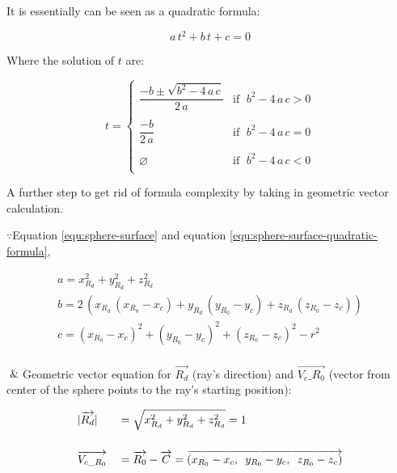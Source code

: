It is essentially can be seen as a quadratic formula:

\begin{equation}
\label{equ:sphere-surface-quadratic-formula}
a\,t^2 + b\,t + c = 0
\end{equation}

Where the solution of $t$ are:

\begin{equation}
\label{equ:sphere-t-solution}
t =
\begin{cases}
\dfrac{-b \pm \sqrt{b^2 - 4\,a\,c}}{2\,a} & \text{if }\;b^2 - 4\,a\,c > 0\\\\
\dfrac{-b}{2\,a} & \text{if }\; b^2 - 4\,a\,c = 0\\\\
\varnothing & \text{if }\; b^2 - 4\,a\,c < 0\\
\end{cases}
\end{equation}

A further step to get rid of formula complexity by taking in geometric vector calculation.


$\because$\;\;\;\;Equation \ref{equ:sphere-surface} and equation \ref{equ:sphere-surface-quadratic-formula},

\[
\begin{array}{lr}
a = x_{R_d}^2 + y_{R_d}^2 + z_{R_d}^2\\
b = 2\,(x_{R_d}\,(x_{R_0} - x_c) + y_{R_d}\,(y_{R_0} - y_c) + z_{R_d}\,(z_{R_0} - z_c))\\
c = (x_{R_0} - x_c)^2 + (y_{R_0} - y_c)^2 + (z_{R_0} - z_c)^2 - r^2\\
\end{array}
\]

$\And$\;\;\;\;Geometric vector equation for $\overrightarrow{R_d}$ (ray's direction) and $\overrightarrow{V_c\_R_0}$ (vector from center of the sphere points to the ray's starting position):

\[
\begin{array}{lr}
\begin{aligned}
&\lvert \overrightarrow{R_d} \rvert &&= \sqrt{x_{R_d}^2 + y_{R_d}^2 + z_{R_d}^2} = 1\\\\
&\overrightarrow{V_{c\_R_0}} &&= \overrightarrow{R_0} - \overrightarrow{C} = \overrightarrow{(x_{R_0} - x_c,\enspace y_{R_0} - y_c,\enspace z_{R_0} - z_c)}\\
\end{aligned}
\end{array}
\]

